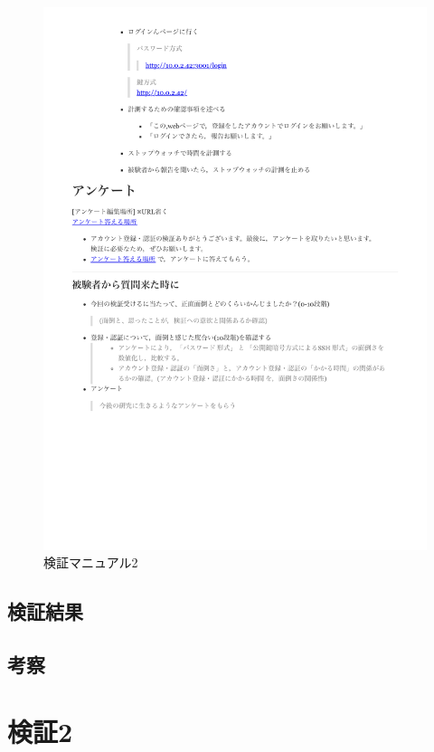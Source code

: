  \vspace{4cm}%
 \begin{figure}[H]
     \includegraphics[width=15cm]{./fig/chapter4/inspect_1/manual/manual_2.pdf}
     \caption{検証マニュアル2}
     \label{検証マニュアル２}
 \end{figure}

\subsection{検証結果}
\subsection{考察}

\newpage


\section{検証2}